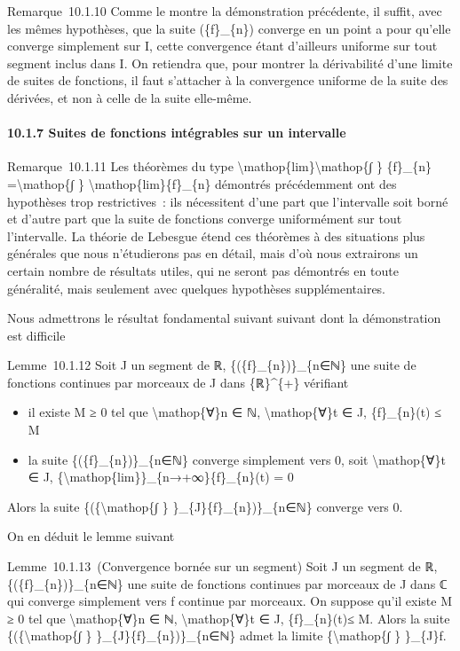 \documentclass[]{article}
\begin{document}
Remarque~10.1.10 Comme le montre la démonstration précédente, il suffit,
avec les mêmes hypothèses, que la suite (\{f\}\_\{n\}) converge en un
point a pour qu'elle converge simplement sur I, cette convergence étant
d'ailleurs uniforme sur tout segment inclus dans I. On retiendra que,
pour montrer la dérivabilité d'une limite de suites de fonctions, il
faut s'attacher à la convergence uniforme de la suite des dérivées, et
non à celle de la suite elle-même.

\paragraph{10.1.7 Suites de fonctions intégrables sur un intervalle}

Remarque~10.1.11 Les théorèmes du type
\textbackslash{}mathop\{lim\}\textbackslash{}mathop\{∫ \} \{f\}\_\{n\}
=\textbackslash{}mathop\{∫ \} \textbackslash{}mathop\{lim\}\{f\}\_\{n\}
démontrés précédemment ont des hypothèses trop restrictives~: ils
nécessitent d'une part que l'intervalle soit borné et d'autre part que
la suite de fonctions converge uniformément sur tout l'intervalle. La
théorie de Lebesgue étend ces théorèmes à des situations plus générales
que nous n'étudierons pas en détail, mais d'où nous extrairons un
certain nombre de résultats utiles, qui ne seront pas démontrés en toute
généralité, mais seulement avec quelques hypothèses supplémentaires.

Nous admettrons le résultat fondamental suivant suivant dont la
démonstration est difficile

Lemme~10.1.12 Soit J un segment de ℝ, \{(\{f\}\_\{n\})\}\_\{n∈ℕ\} une
suite de fonctions continues par morceaux de J dans \{ℝ\}\^{}\{+\}
vérifiant

\begin{itemize}
\itemsep1pt\parskip0pt
\item
  il existe M ≥ 0 tel que \textbackslash{}mathop\{∀\}n ∈ ℕ,
  \textbackslash{}mathop\{∀\}t ∈ J, \{f\}\_\{n\}(t) ≤ M
\item
  la suite \{(\{f\}\_\{n\})\}\_\{n∈ℕ\} converge simplement vers 0, soit
  \textbackslash{}mathop\{∀\}t ∈ J,
  \{\textbackslash{}mathop\{lim\}\}\_\{n→+∞\}\{f\}\_\{n\}(t) = 0
\end{itemize}

Alors la suite \{(\{\textbackslash{}mathop\{∫ \}
\}\_\{J\}\{f\}\_\{n\})\}\_\{n∈ℕ\} converge vers 0.

On en déduit le lemme suivant

Lemme~10.1.13~(Convergence bornée sur un segment) Soit J un segment de
ℝ, \{(\{f\}\_\{n\})\}\_\{n∈ℕ\} une suite de fonctions continues par
morceaux de J dans ℂ qui converge simplement vers f continue par
morceaux. On suppose qu'il existe M ≥ 0 tel que
\textbackslash{}mathop\{∀\}n ∈ ℕ, \textbackslash{}mathop\{∀\}t ∈ J,
\textbar{}\{f\}\_\{n\}(t)\textbar{}≤ M. Alors la suite
\{(\{\textbackslash{}mathop\{∫ \} \}\_\{J\}\{f\}\_\{n\})\}\_\{n∈ℕ\}
admet la limite \{\textbackslash{}mathop\{∫ \} \}\_\{J\}f.
\end{document}
